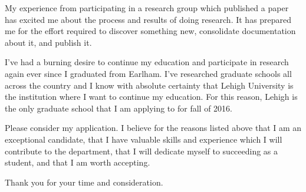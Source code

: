 \documentclass{article}
\begin{document}
My experience from participating in a research group which published a paper has excited me about the process and results of doing research. It has prepared me for the effort required to discover something new, consolidate documentation about it, and publish it.

I've had a burning desire to continue my education and participate in research again ever since I graduated from Earlham. I've researched graduate schools all across the country and I know with absolute certainty that Lehigh University is the institution where I want to continue my education. For this reason, Lehigh is the only graduate school that I am applying to for fall of 2016.

Please consider my application. I believe for the reasons listed above that I am an exceptional candidate, that I have valuable skills and experience which I will contribute to the department, that I will dedicate myself to succeeding as a student, and that I am worth accepting.

Thank you for your time and consideration.
\end{document}
